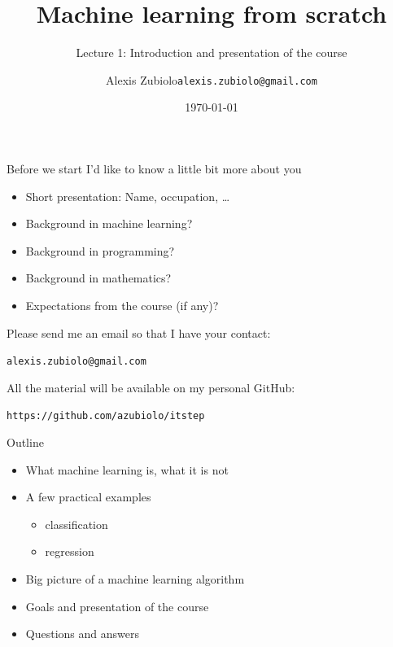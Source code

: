 \documentclass{beamer}
\title[Course presentation]{Machine learning from scratch}
\subtitle{Lecture 1: Introduction and presentation of the course}
\author{Alexis Zubiolo\newline\texttt{alexis.zubiolo@gmail.com}}
\institute{Data Science Team Lead @ Adcash}
\date{\today}
\begin{document}
\begin{frame}
  \titlepage
\end{frame}

\begin{frame}{Before we start}
\vfill
I'd like to know a little bit more about you
\vfill
\begin{itemize}
	\item Short presentation: Name, occupation, \ldots
	\item Background in machine learning?
	\item Background in programming?
	\item Background in mathematics?
	\item Expectations from the course (if any)?
\end{itemize}
\vfill
Please send me an email so that I have your contact:
\vfill
\begin{center}
\texttt{alexis.zubiolo@gmail.com}
\end{center}
\vfill
All the material will be available on my personal GitHub:
\vfill
\begin{center}
\texttt{https://github.com/azubiolo/itstep}
\end{center}
\vfill
\end{frame}

\begin{frame}{Outline}
\vfill
\begin{itemize}
  \item What machine learning is, what it is not
\vfill
  \item A few practical examples
  \begin{itemize}
  	\item classification
  	\item regression
  \end{itemize}
\vfill
	\item Big picture of a machine learning algorithm
\vfill
  \item Goals and presentation of the course 
\vfill
  \item Questions and answers
\end{itemize}
\vfill

\end{frame}
\end{document}
